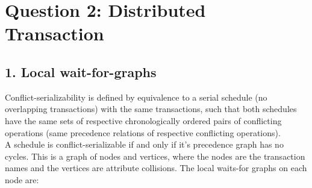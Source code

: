 \documentclass{article}      %
\begin{document}
\section* {Question 2: Distributed Transaction}

\subsection* {1. Local wait-for-graphs}
Conflict-serializability is defined by equivalence to a serial schedule (no overlapping transactions) with the same transactions, such that both schedules have the same sets of respective chronologically ordered pairs of conflicting operations (same precedence relations of respective conflicting operations).\\

A schedule is conflict-serializable if and only if it's precedence graph has no cycles. This is a graph of nodes and vertices, where the nodes are the transaction names and the vertices are attribute collisions. The local waits-for graphs on each node are:\\
\end{document}

